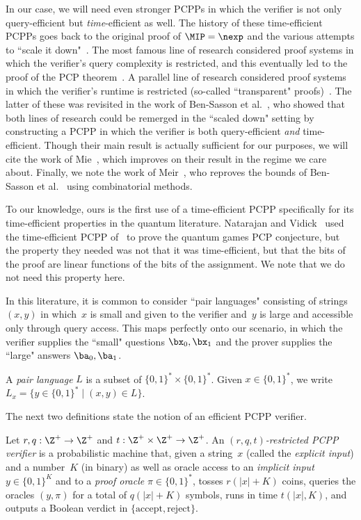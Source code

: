 In our case, we will need even stronger PCPPs in which the verifier is not only query-efficient but \emph{time}-efficient as well.
The history of these time-efficient PCPPs goes back to the original proof of $\MIP = \nexp$ and the various attempts to ``scale it down"~\cite{OD05}.
The most famous line of research considered proof systems in which the verifier's query complexity is restricted,
and this eventually led to the proof of the PCP theorem~\cite{AS98,ALM+98}.
A parallel line of research considered proof systems in which the verifier's runtime is restricted (so-called ``transparent" proofs)~\cite{BFLS91}.
The latter of these was revisited in the work of Ben-Sasson et al.~\cite{BGH+05},
who showed that both lines of research could be remerged in the ``scaled down" setting
by constructing a PCPP in which the verifier is both query-efficient \emph{and} time-efficient.
Though their main result is actually sufficient for our purposes,
we will cite the work of Mie~\cite{Mie09}, which improves on their result in the regime we care about.
Finally, we note the work of Meir~\cite{Mei14}, who reproves the bounds of Ben-Sasson et al.~\cite{BGH+05} using combinatorial methods.

To our knowledge, ours is the first use of a time-efficient PCPP specifically for its time-efficient properties in the quantum literature.
Natarajan and Vidick~\cite{NV18a} used the time-efficient PCPP of~\cite{BGH+05} to prove the quantum games PCP conjecture,
but the property they needed was not that it was time-efficient,
but that the bits of the proof are linear functions of the bits of the assignment.
We note that we do not need this property here.

In this literature, it is common to consider ``pair languages" consisting of strings $(x, y)$
in which~$x$ is small and given to the verifier and~$y$ is large and accessible only through query access.
This maps perfectly onto our scenario,
in which the verifier supplies the ``small" questions $\bx_0, \bx_1$
and the prover supplies the ``large" answers $\ba_0, \ba_1$.

\begin{definition}
A \emph{pair language} $L$ is a subset of $\{0, 1\}^* \times \{0, 1\}^*$.
Given $x \in \{0, 1\}^*$, we write $L_x = \{y \in \{0, 1\}^* \mid (x,y) \in L\}$.
\end{definition}

The next two definitions state the notion of an efficient PCPP verifier.

\begin{definition}
Let $r, q:\Z^+ \rightarrow \Z^+$ and $t:\Z^+ \times \Z^+ \rightarrow \Z^+$.
An \emph{$(r, q, t)$-restricted PCPP verifier} is a probabilistic machine that, given a string~$x$ (called the \emph{explicit input})
and a number~$K$ (in binary) as well as oracle access to an \emph{implicit input} $y \in \{0, 1\}^{K}$ and to a \emph{proof oracle} $\pi \in \{0, 1\}^*$,
tosses $r(|x|+K)$ coins, queries the oracles $(y, \pi)$ for a total of $q(|x|+K)$ symbols,
runs in time $t(|x|, K)$, and outputs a Boolean verdict in $\{\mathrm{accept}, \mathrm{reject}\}$.
\end{definition}


